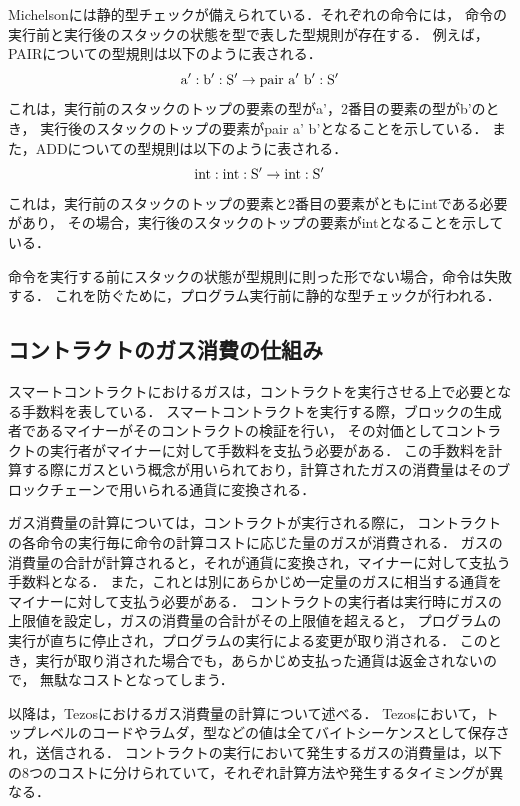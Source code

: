 \documentclass{kuisthesis}
\begin{document}
Michelsonには静的型チェックが備えられている．それぞれの命令には，
命令の実行前と実行後のスタックの状態を型で表した型規則が存在する．
例えば，PAIRについての型規則は以下のように表される．
\begin{displaymath}
  {\rm a' : b' : S'} \rightarrow {\rm pair\ a'\ b' : S'}
\end{displaymath}
これは，実行前のスタックのトップの要素の型がa'，2番目の要素の型がb'のとき，
実行後のスタックのトップの要素がpair a' b'となることを示している．
また，ADDについての型規則は以下のように表される．
\begin{displaymath}
  {\rm int : int : S'} \rightarrow {\rm int : S'}
\end{displaymath}
これは，実行前のスタックのトップの要素と2番目の要素がともにintである必要があり，
その場合，実行後のスタックのトップの要素がintとなることを示している．

命令を実行する前にスタックの状態が型規則に則った形でない場合，命令は失敗する．
これを防ぐために，プログラム実行前に静的な型チェックが行われる．

\subsection{コントラクトのガス消費の仕組み}\label{subsec-pre-gas}
スマートコントラクトにおけるガスは，コントラクトを実行させる上で必要となる手数料を表している．
スマートコントラクトを実行する際，ブロックの生成者であるマイナーがそのコントラクトの検証を行い，
その対価としてコントラクトの実行者がマイナーに対して手数料を支払う必要がある．
この手数料を計算する際にガスという概念が用いられており，計算されたガスの消費量はそのブロックチェーンで用いられる通貨に変換される．


ガス消費量の計算については，コントラクトが実行される際に，
コントラクトの各命令の実行毎に命令の計算コストに応じた量のガスが消費される．
ガスの消費量の合計が計算されると，それが通貨に変換され，マイナーに対して支払う手数料となる．
また，これとは別にあらかじめ一定量のガスに相当する通貨をマイナーに対して支払う必要がある．
コントラクトの実行者は実行時にガスの上限値を設定し，ガスの消費量の合計がその上限値を超えると，
プログラムの実行が直ちに停止され，プログラムの実行による変更が取り消される．
このとき，実行が取り消された場合でも，あらかじめ支払った通貨は返金されないので，
無駄なコストとなってしまう．

以降は，Tezosにおけるガス消費量の計算について述べる．
Tezosにおいて，トップレベルのコードやラムダ，型などの値は全てバイトシーケンスとして保存され，送信される．
コントラクトの実行において発生するガスの消費量は，以下の8つのコストに分けられていて，それぞれ計算方法や発生するタイミングが異なる．
\end{document}
